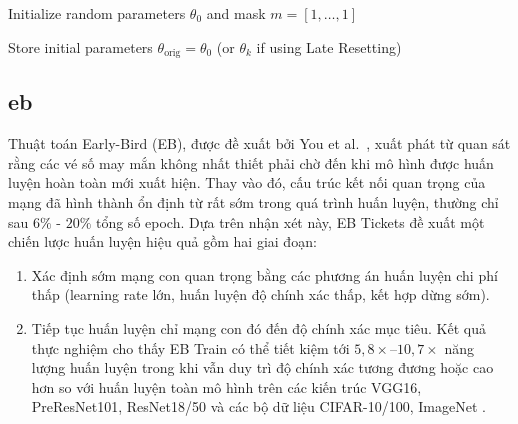 \begin{algorithm}[H]
    \caption{Iterative Magnitude Pruning (IMP)}


    Initialize random parameters $\theta_0$ and mask $m = [1,\dots,1]$\;

    Store initial parameters $\theta_{\text{orig}} = \theta_0$
    (or $\theta_k$ if using Late Resetting)\;



\end{algorithm}

\subsection{\gls{eb}}
Thuật toán Early-Bird (EB), được đề xuất bởi You et al.~\cite{earlybird},
xuất phát từ quan sát rằng các vé số may mắn không nhất thiết
phải chờ đến khi mô hình được huấn luyện hoàn toàn mới xuất hiện.
Thay vào đó, cấu trúc kết nối quan trọng của mạng đã hình thành ổn định từ rất sớm trong quá trình
huấn luyện, thường chỉ sau $6\%$ - $20\%$ tổng số epoch.
Dựa trên nhận xét này, EB Tickets đề xuất một chiến lược huấn luyện hiệu quả gồm hai giai đoạn:
\begin{enumerate}
    \item  Xác định sớm mạng con quan trọng bằng các phương án huấn luyện chi phí thấp
          (learning rate lớn, huấn luyện độ chính xác thấp, kết hợp dừng sớm).
    \item Tiếp tục huấn luyện chỉ mạng con đó đến độ chính xác mục tiêu.
          Kết quả thực nghiệm cho thấy EB Train có thể tiết kiệm tới $5{,}8\times$--$10{,}7\times$ năng lượng
          huấn luyện trong khi vẫn duy trì độ chính xác tương đương hoặc cao hơn so với huấn luyện toàn mô hình
          trên các kiến trúc VGG16, PreResNet101, ResNet18/50 và các bộ dữ liệu CIFAR-10/100, ImageNet \cite{earlybird}.
\end{enumerate}

